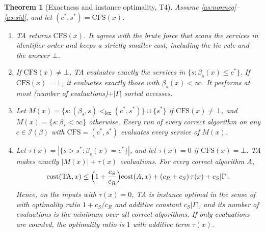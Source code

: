\documentclass[11pt]{article}
\newtheorem{theorem}{Theorem}
\theoremstyle{definition}
\theoremstyle{remark}
\newcommand{\lexlt}{\mathrel{<_{\mathrm{lex}}}}
\newcommand{\cfs}{\mathrm{CFS}}
\begin{document}
\begin{theorem}[Exactness and instance optimality, T4]\label{thm:T4}
Assume \ref{as:nonneg}--\ref{as:sid}, and let $(c^*,s^*)=\cfs(x)$.
\begin{enumerate}[label=(\alph*)]
\item TA returns $\cfs(x)$. It agrees with the brute force that scans the services in
identifier order and keeps a strictly smaller cost, including the tie rule and the answer
$\bot$.
\item If $\cfs(x)\ne\bot$, TA evaluates exactly the services in
$\{s:\beta_s(x)\le c^*\}$. If $\cfs(x)=\bot$, it evaluates exactly those with
$\beta_s(x)<\infty$. It performs at most (number of evaluations)$+|\Gamma|$ sorted accesses.
\item Let $M(x)=\{s:(\beta_s,s)\lexlt(c^*,s^*)\}\cup\{s^*\}$ if $\cfs(x)\ne\bot$, and
$M(x)=\{s:\beta_s<\infty\}$ otherwise. Every run of every correct algorithm on any
$c\in\mathcal I(\beta)$ with $\cfs=(c^*,s^*)$ evaluates every service of $M(x)$.
\item Let $\tau(x)=|\{s>s^*:\beta_s(x)=c^*\}|$, and let $\tau(x)=0$ if $\cfs(x)=\bot$. TA makes
exactly $|M(x)|+\tau(x)$ evaluations. For every correct algorithm $A$,
\[
\mathrm{cost}(\mathrm{TA},x)\le\Bigl(1+\frac{c_S}{c_R}\Bigr)\mathrm{cost}(A,x)+(c_R+c_S)\,\tau(x)+c_S|\Gamma|.
\]
Hence, on the inputs with $\tau(x)=0$, TA is instance optimal in the sense
of~\cite{fagin2003optimal} with optimality ratio $1+c_S/c_R$ and additive constant
$c_S|\Gamma|$, and its number of evaluations is the minimum over all correct algorithms. If
only evaluations are counted, the optimality ratio is $1$ with additive term $\tau(x)$.
\end{enumerate}
\end{theorem}
\end{document}
